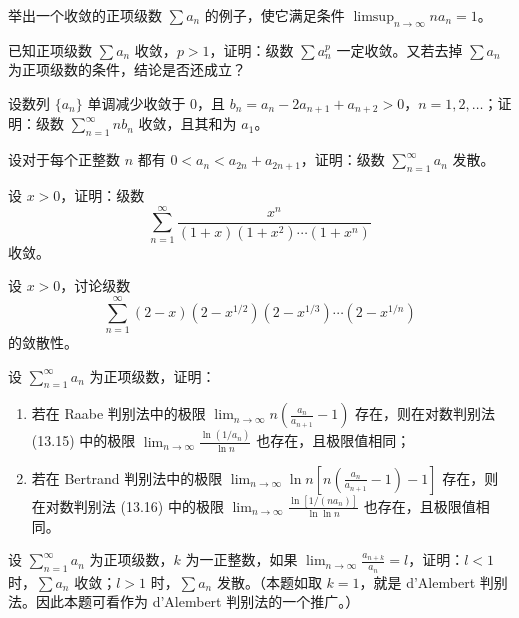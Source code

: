 \begin{xexercise}[6]
举出一个收敛的正项级数 $\sum a_n$ 的例子，使它满足条件 $\limsup_{n\to\infty}na_n=1$。
\end{xexercise}

\begin{xexercise}[7]
已知正项级数 $\sum a_n$ 收敛，$p>1$，证明：级数 $\sum a_n^p$ 一定收敛。又若去掉 $\sum a_n$ 为正项级数的条件，结论是否还成立？
\end{xexercise}

\begin{xexercise}[8]
设数列 $\{a_n\}$ 单调减少收敛于 0，且 $b_n=a_n-2a_{n+1}+a_{n+2}>0$，$n=1,2,\ldots$；证明：级数 $\sum_{n=1}^{\infty}nb_n$ 收敛，且其和为 $a_1$。
\end{xexercise}

\begin{xexercise}[9]
设对于每个正整数 $n$ 都有 $0<a_n<a_{2n}+a_{2n+1}$，证明：级数 $\sum_{n=1}^{\infty}a_n$ 发散。
\end{xexercise}

\begin{xexercise}[10]
设 $x>0$，证明：级数
\[
\sum_{n=1}^{\infty}\frac{x^n}{(1+x)(1+x^2)\cdots(1+x^n)}
\]
收敛。
\end{xexercise}

\begin{xexercise}[11]
设 $x>0$，讨论级数
\[
\sum_{n=1}^{\infty}(2-x)(2-x^{1/2})(2-x^{1/3})\cdots(2-x^{1/n})
\]
的敛散性。
\end{xexercise}

\begin{xexercise}[12]
设 $\sum_{n=1}^{\infty}a_n$ 为正项级数，证明：
\begin{enumerate}[label=(\arabic*)]
\item 若在 Raabe 判别法中的极限 $\lim_{n\to\infty}n\left(\frac{a_n}{a_{n+1}}-1\right)$ 存在，则在对数判别法 (13.15) 中的极限 $\lim_{n\to\infty}\frac{\ln(1/a_n)}{\ln n}$ 也存在，且极限值相同；
\item 若在 Bertrand 判别法中的极限 $\lim_{n\to\infty}\ln n\left[n\left(\frac{a_n}{a_{n+1}}-1\right)-1\right]$ 存在，则在对数判别法 (13.16) 中的极限 $\lim_{n\to\infty}\frac{\ln[1/(na_n)]}{\ln\ln n}$ 也存在，且极限值相同。
\end{enumerate}
\end{xexercise}

\begin{xexercise}[13]
设 $\sum_{n=1}^{\infty}a_n$ 为正项级数，$k$ 为一正整数，如果 $\lim_{n\to\infty}\frac{a_{n+k}}{a_n}=l$，证明：$l<1$ 时，$\sum a_n$ 收敛；$l>1$ 时，$\sum a_n$ 发散。（本题如取 $k=1$，就是 d'Alembert 判别法。因此本题可看作为 d'Alembert 判别法的一个推广。）
\end{xexercise}

